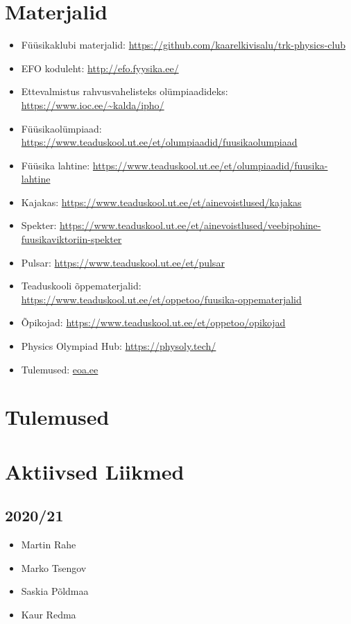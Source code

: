 \documentclass[a4paper,11pt,twocolumn]{article}
\begin{document}
\section{Materjalid}

\begin{itemize}
\item Füüsikaklubi materjalid: \url{https://github.com/kaarelkivisalu/trk-physics-club}
\item EFO koduleht: \url{http://efo.fyysika.ee/}
\item Ettevalmistus rahvusvahelisteks olümpiaadideks: \url{https://www.ioc.ee/~kalda/ipho/}
\item Füüsikaolümpiaad: \url{https://www.teaduskool.ut.ee/et/olumpiaadid/fuusikaolumpiaad}
\item Füüsika lahtine: \url{https://www.teaduskool.ut.ee/et/olumpiaadid/fuusika-lahtine}
\item Kajakas: \url{https://www.teaduskool.ut.ee/et/ainevoistlused/kajakas}
\item Spekter: \url{https://www.teaduskool.ut.ee/et/ainevoistlused/veebipohine-fuusikaviktoriin-spekter}
\item Pulsar: \url{https://www.teaduskool.ut.ee/et/pulsar}
\item Teaduskooli õppematerjalid: \url{https://www.teaduskool.ut.ee/et/oppetoo/fuusika-oppematerjalid}
\item Õpikojad: \url{https://www.teaduskool.ut.ee/et/oppetoo/opikojad}
\item Physics Olympiad Hub: \url{https://physoly.tech/}
\item Tulemused: \url{eoa.ee}
\end{itemize}


\section{Tulemused}

\section{Aktiivsed Liikmed}

\subsection{2020/21}
\begin{itemize}
    \item Martin Rahe
    \item Marko Tsengov
    \item Saskia Põldmaa
    \item Kaur Redma
\end{itemize}
\end{document}
